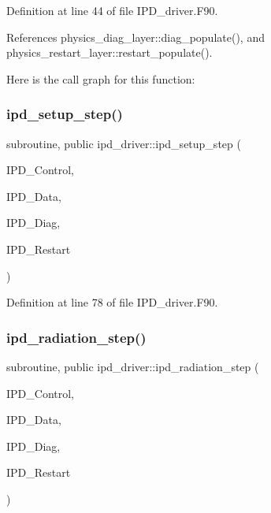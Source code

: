 Definition at line 44 of file I\+P\+D\+\_\+driver.\+F90.



References physics\+\_\+diag\+\_\+layer\+::diag\+\_\+populate(), and physics\+\_\+restart\+\_\+layer\+::restart\+\_\+populate().

Here is the call graph for this function\+:
\mbox{\label{namespaceipd__driver_a3a41040612b769b63caf5a0530e3fcd0}} 
\subsubsection{ipd\+\_\+setup\+\_\+step()}
{\footnotesize\ttfamily subroutine, public ipd\+\_\+driver\+::ipd\+\_\+setup\+\_\+step (\begin{DoxyParamCaption}\item[{type(ipd\+\_\+control\+\_\+type), intent(inout)}]{I\+P\+D\+\_\+\+Control,  }\item[{type(ipd\+\_\+data\+\_\+type), dimension(\+:), intent(inout)}]{I\+P\+D\+\_\+\+Data,  }\item[{type(ipd\+\_\+diag\+\_\+type), dimension(\+:), intent(inout)}]{I\+P\+D\+\_\+\+Diag,  }\item[{type(ipd\+\_\+restart\+\_\+type), intent(inout)}]{I\+P\+D\+\_\+\+Restart }\end{DoxyParamCaption})}



Definition at line 78 of file I\+P\+D\+\_\+driver.\+F90.

\mbox{\label{namespaceipd__driver_a989c8f027a74c596a5c61903046b2ca7}} 
\subsubsection{ipd\+\_\+radiation\+\_\+step()}
{\footnotesize\ttfamily subroutine, public ipd\+\_\+driver\+::ipd\+\_\+radiation\+\_\+step (\begin{DoxyParamCaption}\item[{type(ipd\+\_\+control\+\_\+type), intent(inout)}]{I\+P\+D\+\_\+\+Control,  }\item[{type(ipd\+\_\+data\+\_\+type), intent(inout)}]{I\+P\+D\+\_\+\+Data,  }\item[{type(ipd\+\_\+diag\+\_\+type), dimension(\+:), intent(inout)}]{I\+P\+D\+\_\+\+Diag,  }\item[{type(ipd\+\_\+restart\+\_\+type), intent(inout)}]{I\+P\+D\+\_\+\+Restart }\end{DoxyParamCaption})}



